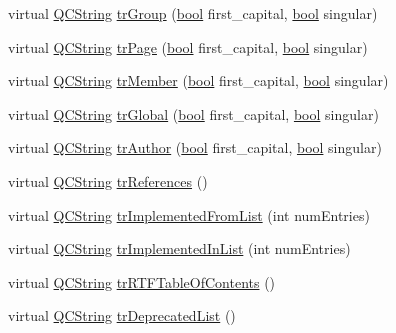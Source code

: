 \begin{DoxyCompactItemize}
virtual \hyperlink{class_q_c_string}{Q\+C\+String} \hyperlink{class_translator_portuguese_ae0a58191f357edad54d3f37cf9626455}{tr\+Group} (\hyperlink{qglobal_8h_a1062901a7428fdd9c7f180f5e01ea056}{bool} first\+\_\+capital, \hyperlink{qglobal_8h_a1062901a7428fdd9c7f180f5e01ea056}{bool} singular)
\item 
virtual \hyperlink{class_q_c_string}{Q\+C\+String} \hyperlink{class_translator_portuguese_a27eeda494bdc419a1d5c1d39a2d1864c}{tr\+Page} (\hyperlink{qglobal_8h_a1062901a7428fdd9c7f180f5e01ea056}{bool} first\+\_\+capital, \hyperlink{qglobal_8h_a1062901a7428fdd9c7f180f5e01ea056}{bool} singular)
\item 
virtual \hyperlink{class_q_c_string}{Q\+C\+String} \hyperlink{class_translator_portuguese_afc3ce1ccaf2a1af687aed2f04c307547}{tr\+Member} (\hyperlink{qglobal_8h_a1062901a7428fdd9c7f180f5e01ea056}{bool} first\+\_\+capital, \hyperlink{qglobal_8h_a1062901a7428fdd9c7f180f5e01ea056}{bool} singular)
\item 
virtual \hyperlink{class_q_c_string}{Q\+C\+String} \hyperlink{class_translator_portuguese_a7141e5f23b1f3e2e37433cb41b513dcf}{tr\+Global} (\hyperlink{qglobal_8h_a1062901a7428fdd9c7f180f5e01ea056}{bool} first\+\_\+capital, \hyperlink{qglobal_8h_a1062901a7428fdd9c7f180f5e01ea056}{bool} singular)
\item 
virtual \hyperlink{class_q_c_string}{Q\+C\+String} \hyperlink{class_translator_portuguese_a9eb5a895d51570ce368e064746a6cc14}{tr\+Author} (\hyperlink{qglobal_8h_a1062901a7428fdd9c7f180f5e01ea056}{bool} first\+\_\+capital, \hyperlink{qglobal_8h_a1062901a7428fdd9c7f180f5e01ea056}{bool} singular)
\item 
virtual \hyperlink{class_q_c_string}{Q\+C\+String} \hyperlink{class_translator_portuguese_a17f6aa45e113272eda6e36c01ee99a7c}{tr\+References} ()
\item 
virtual \hyperlink{class_q_c_string}{Q\+C\+String} \hyperlink{class_translator_portuguese_abf92ebb4a3d3fece734b9224b91f199b}{tr\+Implemented\+From\+List} (int num\+Entries)
\item 
virtual \hyperlink{class_q_c_string}{Q\+C\+String} \hyperlink{class_translator_portuguese_a0ede69fe6802ec86184ba3e2c259e94d}{tr\+Implemented\+In\+List} (int num\+Entries)
\item 
virtual \hyperlink{class_q_c_string}{Q\+C\+String} \hyperlink{class_translator_portuguese_a29311f67bfde32cffc992895b6f7ae0f}{tr\+R\+T\+F\+Table\+Of\+Contents} ()
\item 
virtual \hyperlink{class_q_c_string}{Q\+C\+String} \hyperlink{class_translator_portuguese_a1a1007b64d337d6674e1c5729c49a950}{tr\+Deprecated\+List} ()

\end{DoxyCompactItemize}
